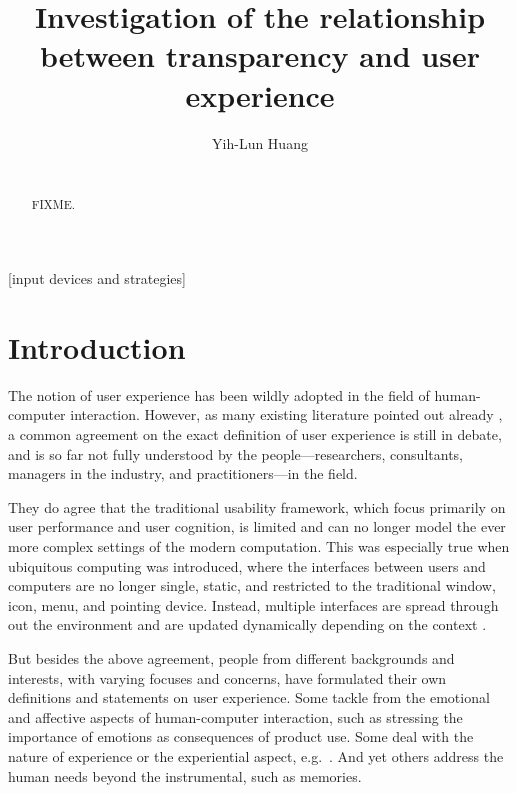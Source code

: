 \documentclass{acm_proc_article-sp}
\begin{document}
\title{Investigation of the relationship between transparency and user
  experience}

\author{
\alignauthor Yih-Lun Huang\\
\\
}

\maketitle
\begin{abstract}
FIXME.
\end{abstract}


[input devices and strategies]




\section{Introduction}
The notion of user experience has been wildly adopted in the field of
human-computer interaction. However, as many existing literature
pointed out already \citep{ux:hassenzahl, ux:law}, a common agreement
on the exact definition of user experience is still in debate, and is
so far not fully understood by the people---researchers, consultants,
managers in the industry, and practitioners---in the field.

They do agree that the traditional usability framework, which focus
primarily on user performance and user cognition, is limited and can
no longer model the ever more complex settings of the modern
computation. This was especially true when ubiquitous computing was
introduced, where the interfaces between users and computers are no
longer single, static, and restricted to the traditional window, icon,
menu, and pointing device. Instead, multiple interfaces are spread
through out the environment and are updated dynamically depending on
the context \citep{windows:bolter}.

But besides the above agreement, people from different backgrounds and
interests, with varying focuses and concerns, have formulated their
own definitions and statements on user experience. Some tackle from
the emotional and affective aspects of human-computer interaction,
such as stressing the importance of emotions as consequences of
product use. Some deal with the nature of experience or the
experiential aspect, e.g.\ \citet{experience:forlizzi}. And yet others
address the human needs beyond the instrumental, such as memories.
\end{document}
